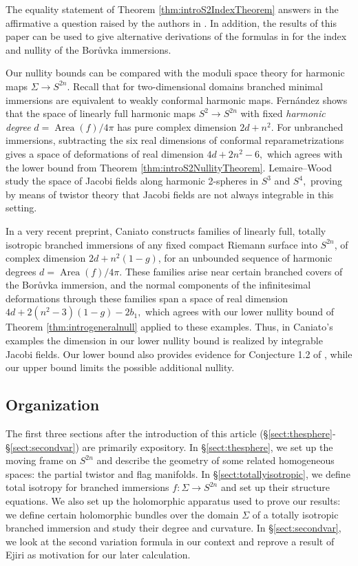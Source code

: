 \documentclass[11pt]{article}
\theoremstyle{definition}
\numberwithin{equation}{section}
\begin{document}
The equality statement of Theorem \ref{thm:introS2IndexTheorem} answers in the affirmative a question raised by the authors in \cite{BallMadnick26}. In addition, the results of this paper can be used to give alternative derivations of the formulas in \cite{BallMadnick26} for the index and nullity of the Bor\r{u}vka immersions.

Our nullity bounds can be compared with the moduli space theory for harmonic maps $\Sigma \to S^{2n}.$ Recall that for two-dimensional domains branched minimal immersions are equivalent to weakly conformal harmonic maps. Fern\'andez \cite{Fernandez12} shows that the space of linearly full harmonic maps $S^2 \to S^{2n}$ with fixed \emph{harmonic degree} $d = \operatorname{Area}(f)/4\pi$ has pure complex dimension $2d+n^2.$ For unbranched immersions, subtracting the six real dimensions of conformal reparametrizations gives a space of deformations of real dimension $4d+2n^2-6,$ which agrees with the lower bound from Theorem \ref{thm:introS2NullityTheorem}. Lemaire--Wood \cite{LemaireWood09} study the space of Jacobi fields along harmonic 2-spheres in $S^3$ and $S^4,$ proving by means of twistor theory that  Jacobi fields are not always integrable in this setting. 

In a very recent preprint, Caniato \cite{Caniato26} constructs families of linearly full, totally isotropic branched immersions of any fixed compact Riemann surface into $S^{2n}$, of complex dimension $2d+n^2(1-g)$, for an unbounded sequence of harmonic degrees $d=\operatorname{Area}(f)/4\pi$. These families arise near certain branched covers of the Bor\r{u}vka immersion, and the normal components of the infinitesimal deformations through these families span a space of real dimension $4d+2(n^2-3)(1-g)-2b_1,$ which agrees with our lower nullity bound of Theorem \ref{thm:introgeneralnull} applied to these examples. Thus, in Caniato's examples the dimension in our lower nullity bound is realized by integrable Jacobi fields. Our lower bound also provides evidence for Conjecture 1.2 of \cite{Caniato26}, while our upper bound limits the possible additional nullity.

\subsection{Organization}

\indent \indent The first three sections after the introduction of this article (\S\ref{sect:thesphere}-\S\ref{sect:secondvar}) are primarily expository. In \S\ref{sect:thesphere}, we set up the moving frame on $S^{2n}$ and describe the geometry of some related homogeneous spaces: the partial twistor and flag manifolds. In \S\ref{sect:totallyisotropic}, we define total isotropy for branched immersions $f: \Sigma \to S^{2n}$ and set up their structure equations. We also set up the holomorphic apparatus used to prove our results: we define certain holomorphic bundles over the domain $\Sigma$ of a totally isotropic branched immersion and study their degree and curvature. In \S\ref{sect:secondvar}, we look at the second variation formula in our context and reprove a result of Ejiri as motivation for our later calculation.
\end{document}
